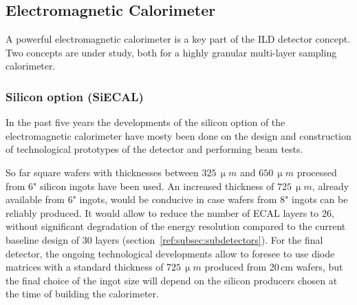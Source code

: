 \subsection{Electromagnetic Calorimeter}
\label{ild:sec:ECAL}
A powerful electromagnetic calorimeter is a key part of the ILD detector concept. Two concepts are under study, both for a highly granular multi-layer sampling calorimeter. 

\subsubsection{Silicon option (SiECAL)}

In the past five years the developments of the silicon option of the electromagnetic calorimeter have mosty been done on the design and construction of technological prototypes of the detector and performing beam tests. 

So far square wafers with thicknesses between $325\,\upmu m$ and $650\,\upmu m$ processed from 6" silicon ingots have been used. 
An increased thickness of $725\,\upmu m$, already available from 6" ingots, would be conducive in case wafers from 8" ingots can be reliably produced. It would allow to reduce the number of ECAL layers to 26, without significant degradation of the energy resolution compared to the current baseline design of 30 layers (section~\ref{ref:subsec:subdetectors}). For the final detector, the ongoing technological developments allow to foresee to use diode matrices with a standard thickness of $725\,\upmu m$ produced from 20\,cm wafers, but the final choice of the ingot size will depend on the silicon producers chosen at the time of building the calorimeter.



